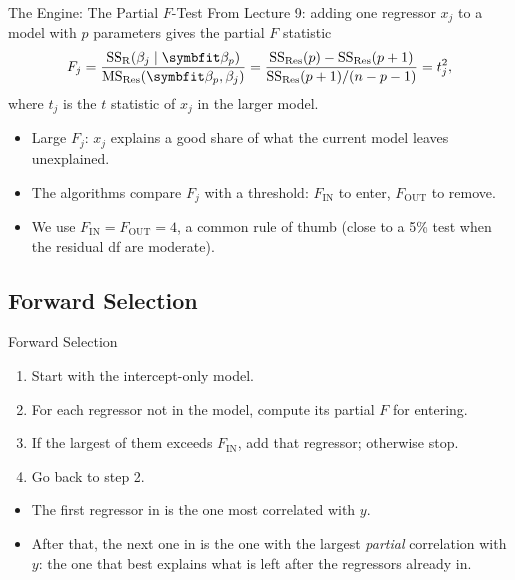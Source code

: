 \begin{frame}{The Engine: The Partial $F$-Test}
    From Lecture 9: adding one regressor $x_j$ to a model with $p$ parameters gives the partial $F$ statistic
    \[
    F_j=\frac{\SSR(\beta_j\mid\bbeta_p)}{\MSRes(\bbeta_p,\beta_j)}
    =\frac{\SSRes(p)-\SSRes(p+1)}{\SSRes(p+1)/(n-p-1)} = t_j^2 ,
    \]
    where $t_j$ is the $t$ statistic of $x_j$ in the larger model.
    \begin{itemize}
        \item Large $F_j$: $x_j$ explains a good share of what the current model leaves unexplained.
        \item The algorithms compare $F_j$ with a threshold: $F_{\text{IN}}$ to enter, $F_{\text{OUT}}$ to remove.
        \item We use $F_{\text{IN}}=F_{\text{OUT}}=4$, a common rule of thumb (close to a 5\% test when the residual df are moderate).
    \end{itemize}
\end{frame}


\subsection{Forward Selection}


\begin{frame}{Forward Selection}
    \begin{enumerate}
        \item Start with the intercept-only model.
        \item For each regressor not in the model, compute its partial $F$ for entering.
        \item If the largest of them exceeds $F_{\text{IN}}$, add that regressor; otherwise stop.
        \item Go back to step 2.
    \end{enumerate}
    \svspace{0.5em}
    \begin{itemize}
        \item The first regressor in is the one most correlated with $y$.
        \item After that, the next one in is the one with the largest \emph{partial} correlation with $y$: the one that best explains what is left after the regressors already in.
    \end{itemize}
\end{frame}


